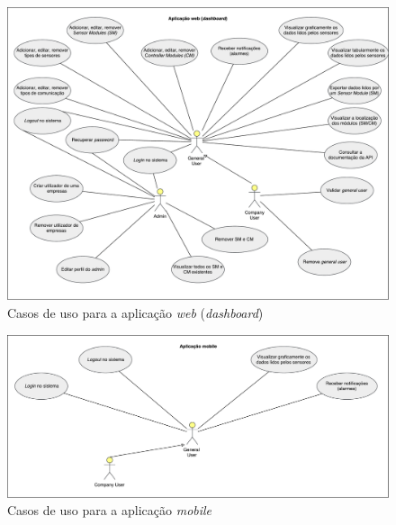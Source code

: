 \begin{figure}[!htb]
	\centering
	\includegraphics[width=0.85\linewidth]{esquemas/use-case-web.pdf}
	\caption{Casos de uso para a aplicação \textit{web} (\textit{dashboard}) }
	\label{usedash}
\end{figure}

\newpage

\begin{figure}[!htb]
	\centering
	\includegraphics[width=0.85\linewidth]{esquemas/use-case-mobile.pdf}
	\caption{Casos de uso para a aplicação \textit{mobile}}
	\label{useMobile}
\end{figure}

